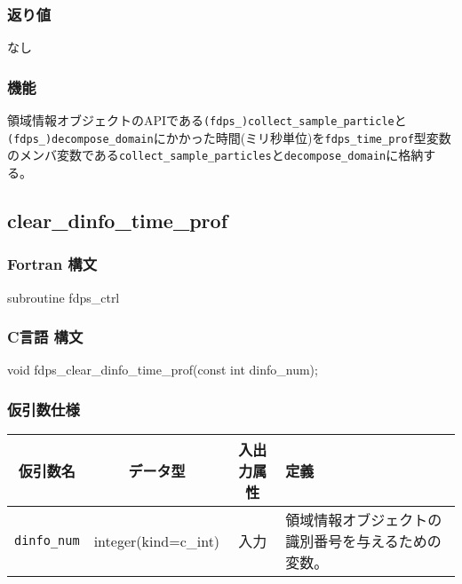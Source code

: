 \subsubsection*{返り値}
なし

\subsubsection*{機能}
領域情報オブジェクトのAPIである\texttt{(fdps\_)collect\_sample\_particle}と\texttt{(fdps\_)decompose\_domain}にかかった時間(ミリ秒単位)を\texttt{fdps\_time\_prof}型変数のメンバ変数である\texttt{collect\_sample\_particles}と\texttt{decompose\_domain}に格納する。

\clearpage

\subsection{clear\_dinfo\_time\_prof}
\subsubsection*{Fortran 構文}
\begin{screen}
\begin{spverbatim}
subroutine fdps_ctrl%
\end{spverbatim}
\end{screen}

\subsubsection*{C言語 構文}
\begin{screen}
\begin{spverbatim}
void fdps_clear_dinfo_time_prof(const int dinfo_num);
\end{spverbatim}
\end{screen}

\subsubsection*{仮引数仕様}
\begin{table}[h]
\begin{tabularx}{\linewidth}{cccX}
\toprule
\rowcolor{Snow2}
仮引数名 & データ型 & 入出力属性 & 定義 \\
\midrule
\texttt{dinfo\_num} & integer(kind=c\_int) & 入力 & 領域情報オブジェクトの識別番号を与えるための変数。\\
\bottomrule
\end{tabularx}
\end{table}

